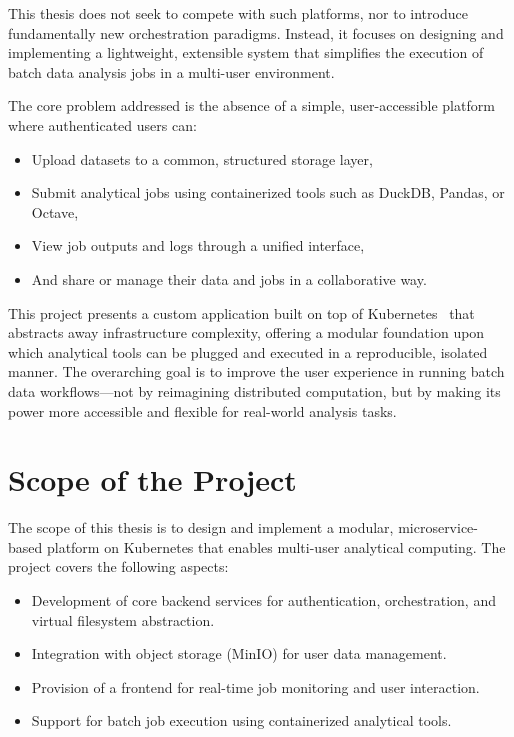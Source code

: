 This thesis does not seek to compete with such platforms, nor to introduce fundamentally new orchestration paradigms. 
Instead, it focuses on designing and implementing a lightweight, extensible system that simplifies the execution of batch 
data analysis jobs in a multi-user environment.

The core problem addressed is the absence of a simple, user-accessible platform where authenticated users can:
\begin{itemize}
    \item Upload datasets to a common, structured storage layer,
    \item Submit analytical jobs using containerized tools such as DuckDB, Pandas, or Octave,
    \item View job outputs and logs through a unified interface,
    \item And share or manage their data and jobs in a collaborative way.
\end{itemize}

This project presents a custom application built on top of Kubernetes~\cite{google-kubernetes} that abstracts away infrastructure complexity, 
offering a modular foundation upon which analytical tools can be plugged and executed in a reproducible, isolated manner. 
The overarching goal is to improve the user experience in running batch data workflows—not by reimagining distributed computation, 
but by making its power more accessible and flexible for real-world analysis tasks.



\section{Scope of the Project}
\hspace{2mm}The scope of this thesis is to design and implement a modular, microservice-based platform on Kubernetes that enables multi-user analytical computing. The project covers the following aspects:

\begin{itemize}
    \item Development of core backend services for authentication, orchestration, and virtual filesystem abstraction.
    \item Integration with object storage (MinIO) for user data management.
    \item Provision of a frontend for real-time job monitoring and user interaction.
    \item Support for batch job execution using containerized analytical tools.
\end{itemize}

